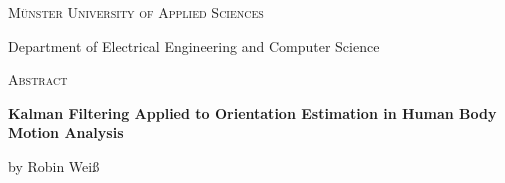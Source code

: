 \thispagestyle{plain}
  \null\vfil
  
\begin{center}
    \setlength{\parskip}{0pt}
    {\large \textsc{Münster University of Applied Sciences} \par}
    \medskip
    {\normalsize Department of Electrical Engineering and Computer Science \par}
    \bigskip
    {\huge{\textsc{Abstract}} \par}
    \bigskip
    {\normalsize\bf Kalman Filtering Applied to Orientation Estimation in Human Body Motion Analysis \par}
    \medskip
    {\normalsize by Robin Weiß \par}
    \bigskip
\end{center}

\noindent
\blindtext


